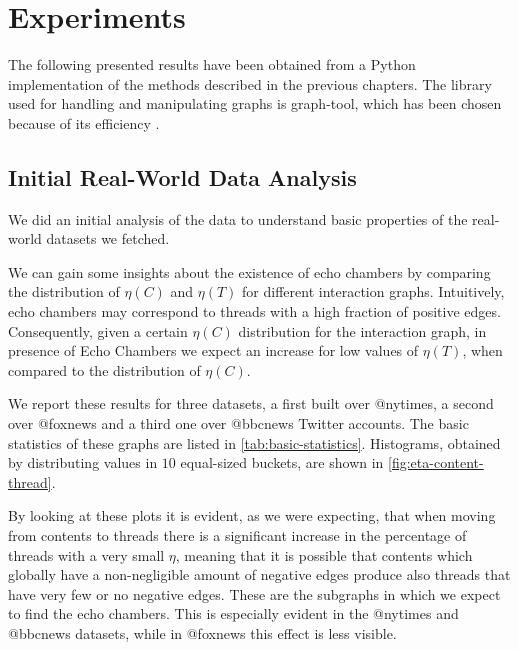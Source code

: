 \section{Experiments}

The following presented results have been obtained from a Python
implementation of the methods described in the previous chapters. The library used
for handling and manipulating graphs is graph-tool, which has been chosen
because of its efficiency \cite{peixoto_graph-tool_2014}.

\subsection{Initial Real-World Data Analysis}%
\label{sub:validity_problem_definition}

We did an initial analysis of the data to understand basic properties of the
real-world datasets we fetched.

We can gain some insights about the existence of echo chambers by comparing
the distribution of $\eta(C)$ and $\eta(T)$ for different interaction graphs.
Intuitively, echo chambers may correspond to threads with a
high fraction of positive edges. Consequently, given a certain $\eta(C)$
distribution for the interaction graph, in presence of Echo Chambers we expect
an increase for low values of $\eta(T)$, when compared to the distribution of
$\eta(C)$.

We report these results for
three datasets, a first built over @nytimes, a second over @foxnews
and a third one over @bbcnews Twitter accounts\footnotemark. The basic
statistics of these graphs are listed in \autoref{tab:basic-statistics}. Histograms, obtained
by distributing values in $10$ equal-sized buckets, are shown in \autoref{fig:eta-content-thread}.


By looking at these plots it is evident, as we were expecting, that when
moving from
contents to threads there is a significant increase in the percentage of
threads with a very small $\eta$, meaning that it is possible that contents which
globally have
a non-negligible amount of negative edges produce also threads that have
very few or no negative edges. These are the subgraphs in which we expect to
find the echo chambers. This is especially evident in the @nytimes and @bbcnews
datasets, while in @foxnews this effect is less visible.

